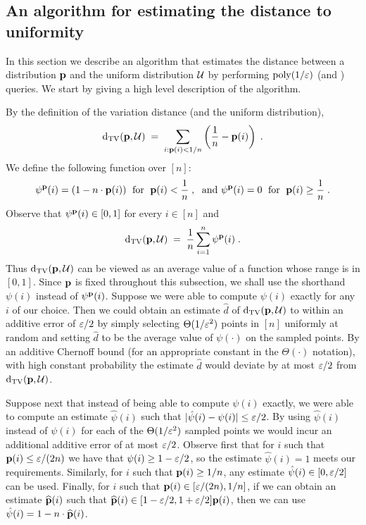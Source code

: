 \subsection{An algorithm for estimating the distance to uniformity}
In this section we describe an algorithm that estimates the distance
between a distribution $\mathbf{p}$ and the uniform distribution $\mathcal{U}$ by performing
$\operatorname*{poly}(1/\varepsilon)$ \PCOND (and \SAMP) queries. We start by giving a high
level description of the algorithm.

By the definition of the variation distance (and the uniform distribution),
\begin{equation}
\operatorname{d}_{\textrm{TV}}(\mathbf{p},\mathcal{U}) \;=\; \sum_{i: \mathbf{p}(i) < 1/n}\left(\frac{1}{n} - \mathbf{p}(i)\right)\;.
\end{equation}
\noindent We define the following function over $[n]$:
\begin{equation}\label{eq:alpha-def}
\psi^{\mathbf{p}}(i) = (1-n\cdot\mathbf{p}(i)) \;\mbox{ for }\; \mathbf{p}(i) < \frac{1}{n}\;,\;\mbox{ and } \psi^{\mathbf{p}}(i) = 0 \;\mbox{ for }\; \mathbf{p}(i) \geq \frac{1}{n}\;.
\end{equation}
Observe that $\psi^{\mathbf{p}}(i) \in [0,1]$ for every $i \in [n]$ and
\begin{equation}\label{eq:dtv-alpha-Dist}
\operatorname{d}_{\textrm{TV}}(\mathbf{p},\mathcal{U}) \;=\; \frac{1}{n}\sum_{i=1}^{n} \psi^{\mathbf{p}}(i)\;.
\end{equation}
Thus $\operatorname{d}_{\textrm{TV}}(\mathbf{p},\mathcal{U})$ can be viewed as an average value of
a function whose range is in $[0,1]$. Since $\mathbf{p}$ is fixed throughout
this subsection, we shall use the shorthand $\psi(i)$ instead
of $\psi^{\mathbf{p}}(i)$.
Suppose we were able to compute $\psi(i)$ exactly for any $i$ of our
choice. Then we could obtain an estimate $\hat{d}$ of
$\operatorname{d}_{\textrm{TV}}(\mathbf{p},\mathcal{U})$ to within an additive error of $\varepsilon/2$ by simply
selecting $\Theta(1/\varepsilon^2)$ points in $[n]$ uniformly at random
and setting $\hat{d}$ to be the average value of $\psi(\cdot)$ on
the sampled points. By an additive Chernoff bound (for an appropriate
constant in the $\Theta(\cdot)$ notation), with high constant
probability the estimate $\hat{d}$ would deviate by at most $\varepsilon/2$
from $\operatorname{d}_{\textrm{TV}}(\mathbf{p},\mathcal{U})$.

Suppose next that instead of being able to compute $\psi(i)$
exactly, we were able to compute an estimate $\hat{\psi}(i)$
such that
$|\hat{\psi}(i) -\psi(i)| \leq \varepsilon/2$.
By using $\hat{\psi}(i)$ instead of $\psi(i)$ for
each of the $\Theta(1/\varepsilon^2)$ sampled points we would incur
an additional additive error of at most $\varepsilon/2$.
Observe first that for $i$ such that $\mathbf{p}(i) \leq \varepsilon/(2n)$
we have that $\psi(i) \geq 1-\varepsilon/2$, so the
estimate $\hat{\psi}(i)=1$ meets our requirements.
Similarly, for $i$ such that $\mathbf{p}(i) \geq 1/n$, any
estimate $\hat{\psi}(i)\in [0,\varepsilon/2]$ can be used.
Finally, for $i$ such that $\mathbf{p}(i) \in [\varepsilon/(2n),1/n]$,
if we can obtain an estimate $\widehat{\mathbf{p}}(i)$ such that
$\widehat{\mathbf{p}}(i) \in [1-\varepsilon/2,1+\varepsilon/2]\mathbf{p}(i)$, then we can use
$\hat{\psi}(i) = 1 - n\cdot \widehat{\mathbf{p}}(i)$.

